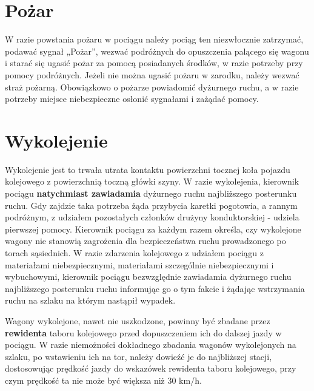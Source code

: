 \section{Pożar}
W razie powstania pożaru w pociągu należy pociąg ten niezwłocznie zatrzymać, podawać sygnał „Pożar”, wezwać podróżnych do opuszczenia palącego się wagonu i starać się ugasić pożar za pomocą posiadanych środków, w razie potrzeby przy pomocy podróżnych. Jeżeli nie można ugasić pożaru w zarodku, należy wezwać straż pożarną. Obowiązkowo o pożarze powiadomić dyżurnego ruchu, a w razie potrzeby miejsce niebezpieczne osłonić sygnałami i zażądać pomocy.

\section{Wykolejenie}
Wykolejenie jest to  trwała utrata kontaktu powierzchni tocznej koła pojazdu kolejowego z powierzchnią toczną główki szyny.
W razie wykolejenia, kierownik pociągu \textbf{natychmiast zawiadamia} dyżurnego ruchu najbliższego posterunku ruchu.
Gdy zajdzie taka potrzeba żąda przybycia karetki pogotowia, a rannym podróżnym, z udziałem pozostałych członków drużyny konduktorskiej - udziela pierwszej pomocy. Kierownik pociągu za każdym razem określa, czy wykolejone wagony nie stanowią zagrożenia dla bezpieczeństwa ruchu prowadzonego po torach sąsiednich. W razie zdarzenia kolejowego z udziałem pociągu z materiałami niebezpiecznymi, materiałami szczególnie niebezpiecznymi i wybuchowymi, kierownik pociągu bezwzględnie zawiadamia dyżurnego ruchu najbliższego posterunku ruchu informując go o tym fakcie i żądając wstrzymania ruchu na szlaku na którym nastąpił wypadek.

Wagony wykolejone, nawet nie uszkodzone, powinny być zbadane przez \textbf{rewidenta} taboru kolejowego przed dopuszczeniem ich do dalszej jazdy w pociągu. W razie niemożności dokładnego zbadania wagonów wykolejonych na szlaku, po wstawieniu ich na tor, należy dowieźć je do najbliższej stacji, dostosowując prędkość jazdy do wskazówek rewidenta taboru kolejowego, przy czym prędkość ta nie może być większa niż 30 km/h.

